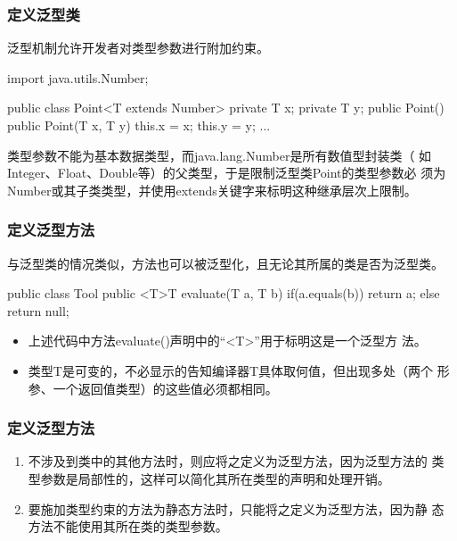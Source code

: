 \begin{frame}[fragile] %
  \frametitle{定义泛型类}


  泛型机制允许开发者对类型参数进行附加约束。

  \begin{javaCode}
    import java.utils.Number;

    public class Point<T extends Number> {
      private T x;
      private T y;
      public Point() {}
      public Point(T x, T y) {
        this.x = x;
        this.y = y;
      }
      ...
    }
  \end{javaCode}

  \pause

  类型参数不能为基本数据类型，而java.lang.Number是所有数值型封装类（
  如Integer、Float、Double等）的父类型，于是限制泛型类Point的类型参数必
  须为Number或其子类类型，并使用extends关键字来标明这种继承层次上限制。
\end{frame}

\begin{frame}[fragile] %
\frametitle{定义泛型方法}

与泛型类的情况类似，{\Red\hei 方法也可以被泛型化，且无论其所属的类是否为泛型类。}


\begin{javaCode}
  public class Tool {
    public <T>T evaluate(T a, T b) {
      if(a.equals(b)) 
      return a;
      else
      return null;
    }
  }  
\end{javaCode}

\pause
\begin{itemize}
\item 上述代码中方法evaluate()声明中的“<T>”用于标明这是一个{\hei 泛型方
    法}。
\item 类型T是可变的，不必显示的告知编译器T具体取何值，但出现多处（两个
  形参、一个返回值类型）的这些值必须都相同。
\end{itemize}
\end{frame}

\begin{frame}[fragile] %
\frametitle{定义泛型方法}


\begin{enumerate}[<+-|alert@+>]
\item 不涉及到类中的其他方法时，则应将之定义为泛型方法，因为泛型方法的
  类型参数是局部性的，这样可以简化其所在类型的声明和处理开销。
\item 要施加类型约束的方法为静态方法时，只能将之定义为泛型方法，因为静
  态方法不能使用其所在类的类型参数。
\end{enumerate}
\end{frame} 

